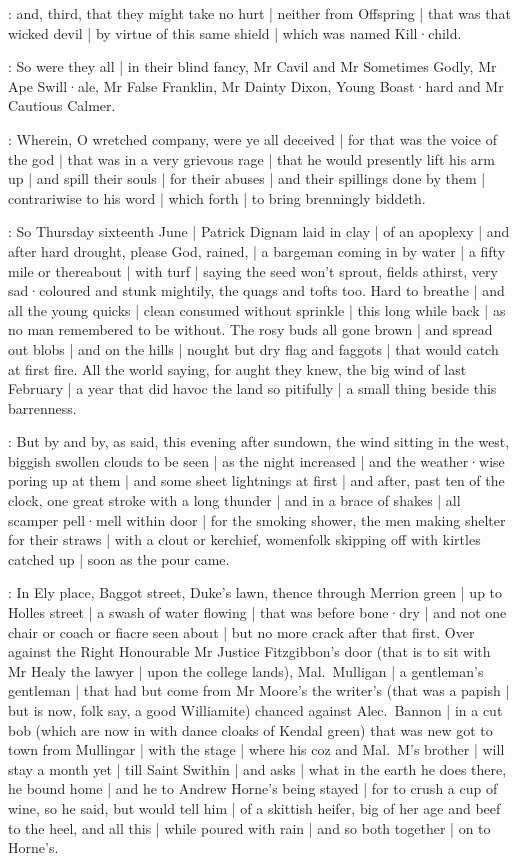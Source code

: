 :
and,
third,
that they might take no hurt |
neither from Offspring |
that was that wicked devil |
by virtue of this same shield |
which was named Kill·child.

:
So were they all |
in their blind fancy,
Mr Cavil and Mr Sometimes Godly,
Mr Ape Swill·ale,
Mr False Franklin,
Mr Dainty Dixon,
Young Boast·hard
and Mr Cautious Calmer.

:
Wherein,
O wretched company,
were ye all deceived |
for that was the voice of the god |
that was in a very grievous rage |
that he would presently lift his arm up |
and spill their souls |
for their abuses |
and their spillings done by them |
contrariwise to his word |
which forth |
to bring brenningly biddeth.



:
So Thursday sixteenth June |
Patrick Dignam laid in clay |
of an apoplexy |
and after hard drought,
please God,
rained, |
a bargeman coming in by water |
a fifty mile or thereabout |
with turf |
saying the seed won't sprout,
fields athirst,
very sad·coloured and stunk mightily,
the quags and tofts too.
Hard to breathe |
and all the young quicks |
clean consumed without sprinkle |
this long while back |
as no man remembered to be without.
The rosy buds all gone brown |
and spread out blobs |
and on the hills |
nought but dry flag and faggots |
that would catch at first fire.
All the world saying,
for aught they knew,
the big wind of last February |
a year that did havoc the land so pitifully |
a small thing beside this barrenness.

:
But by and by,
as said,
this evening after sundown,
the wind sitting in the west,
biggish swollen clouds to be seen |
as the night increased |
and the weather·wise poring up at them |
and some sheet lightnings at first |
and after,
past ten of the clock,
one great stroke with a long thunder |
and in a brace of shakes |
all scamper pell·mell within door |
for the smoking shower,
the men making shelter for their straws |
with a clout or kerchief,
womenfolk skipping off with kirtles catched up |
soon as the pour came.

:
In Ely place,
Baggot street,
Duke's lawn,
thence through Merrion green |
up to Holles street |
a swash of water flowing |
that was before bone·dry |
and not one chair or coach or fiacre seen about |
but no more crack after that first.
Over against the Right Honourable Mr Justice Fitzgibbon's door
(that is to sit with Mr Healy the lawyer |
upon the college lands),
Mal.~Mulligan |
a gentleman's gentleman |
that had but come from Mr Moore's the writer's
(that was a papish |
but is now,
folk say,
a good Williamite)
chanced against Alec.~Bannon |
in a cut bob
(which are now in with dance cloaks of Kendal green)
that was new got to town from Mullingar |
with the stage |
where his coz and Mal.~M's brother |
will stay a month yet |
till Saint Swithin |
and asks |
what in the earth he does there,
he bound home |
and he to Andrew Horne's being stayed |
for to crush a cup of wine,
so he said,
but would tell him |
of a skittish heifer,
big of her age and beef to the heel,
and all this |
while poured with rain |
and so both together |
on to Horne's.

